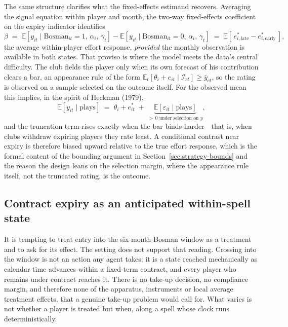 \documentclass{article}
\begin{document}
The same structure clarifies what the fixed-effects estimand recovers. Averaging
the signal equation within player and month, the two-way fixed-effects
coefficient on the expiry indicator identifies
\[
  \beta \;=\;
  \mathbb{E}\!\left[y_{it} \mid \mathrm{Bosman}_{it} = 1,\, \alpha_i,\, \gamma_t\right]
  -
  \mathbb{E}\!\left[y_{it} \mid \mathrm{Bosman}_{it} = 0,\, \alpha_i,\, \gamma_t\right]
  \;=\;
  \mathbb{E}\!\left[\, e^*_{i,\mathrm{late}} - e^*_{i,\mathrm{early}} \,\right],
\]
the average within-player effort response, \emph{provided} the monthly observation is
available in both states. That proviso is where the model meets the data's
central difficulty. The club fields the player only when its own forecast of his
contribution clears a bar, an appearance rule of the form
$\mathbb{E}_t[\theta_i + e_{it} \mid \mathcal{I}_{ct}] \ge \bar{y}_{ct}$, so the
rating is observed on a sample selected on the outcome itself. For the observed
mean this implies, in the spirit of Heckman (1979),
\[
  \mathbb{E}\!\left[y_{it} \mid \text{plays}\right]
  \;=\; \theta_i + e^*_{it} \;+\;
  \underbrace{\mathbb{E}\!\left[\varepsilon_{it} \mid \text{plays}\right]}_{>\,0
  \text{ under selection on } y}
  ,
\]
and the truncation term rises exactly when the bar binds harder---that is, when
clubs withdraw expiring players they rate least. A conditional contrast near
expiry is therefore biased upward relative to the true effort response, which is
the formal content of the bounding argument in
Section~\ref{sec:strategy-bounds} and the reason the design leans on the
selection margin, where the appearance rule itself, not the truncated rating, is
the outcome.

\subsection{Contract expiry as an anticipated within-spell state}
\label{sec:strategy-treatment}

It is tempting to treat entry into the six-month Bosman window as a treatment and
to ask for its effect. The setting does not support that reading. Crossing into the
window is not an action any agent takes; it is a state reached mechanically as
calendar time advances within a fixed-term contract, and every player who remains
under contract reaches it. There is no take-up decision, no compliance margin, and
therefore none of the apparatus, instruments or local average treatment
effects, that a genuine take-up problem would call for. What varies is not whether
a player is treated but when, along a spell whose clock runs
deterministically. \\
\end{document}
